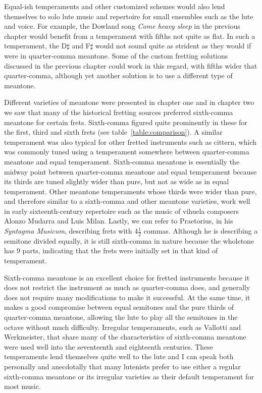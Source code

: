 Equal-ish temperaments and other customized schemes would also lend themselves to solo
lute music and repertoire for small ensembles such as the lute and voice. For example,
the Dowland song \textit{Come heavy sleep} in the previous chapter would benefit
from a temperament with fifths not quite as flat.  In such a temperament, 
the D$\sharp$ and F$\sharp$ would not sound quite as strident as
they would if were in quarter-comma meantone. Some of the custom fretting solutions
discussed in the previous chapter could work in this regard, with fifths wider that
quarter-comma, although yet another solution is to use a different type of
meantone.

Different varieties of meantone were presented in chapter one and in chapter two we saw
that many of the historical fretting sources preferred sixth-comma meantone for certain
frets.   Sixth-comma figured quite prominently in these for the first, third and sixth
frets (see table~\ref{table:comparison}). A similar temperament was also typical for
other fretted instruments such as cittern, which was commonly tuned using a
temperament somewhere between quarter-comma meantone and equal temperament.
\autocite[12]{PF:1}  Sixth-comma meantone is essentially the midway point between
quarter-comma meantone and equal temperament because its thirds are tuned slightly
wider than pure, but not as wide as in equal temperament. Other meantone
temperaments whose thirds were wider than pure, and therefore similar to a sixth-comma
and other meantone varieties, work well in early sixteenth-century repertoire such as
the music of vihuela composers Alonzo Mudarra and Luis Milan.\autocite[56]{WH:1}
Lastly, we can refer to Praetorius, in his \textit{Syntagma Musicum}, describing
frets with 4$ \frac{1}{2} $ commas.\autocite[68]{MP:1} Although he is describing a
semitone divided equally, it is still sixth-comma in nature because the wholetone has 9
parts, indicating that the frets were initially set in that kind of temperament.

Sixth-comma meantone is an excellent choice for fretted instruments because it does not restrict the
instrument as much as quarter-comma does, and generally does not require many modifications to make
it successful. At the same time, it makes a good compromise between equal semitones and the pure
thirds of quarter-comma meantone, allowing the lute to play all the semitones in the octave without
much difficulty. Irregular temperaments, such as Vallotti and Werkmeister, that share many of the
characteristics of sixth-comma meantone were used well into the seventeenth and eighteenth
centuries. These temperaments lend themselves quite well to the lute and I can speak both personally
and anecdotally that many lutenists prefer to use either a regular sixth-comma meantone or its
irregular varieties as their default temperament for most music.

